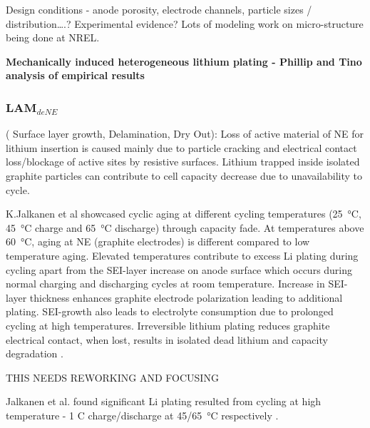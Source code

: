 \documentclass{article}
\begin{document}
Design conditions - anode porosity, electrode channels, particle sizes / distribution….? Experimental evidence? Lots of modeling work on micro-structure being done at NREL.

\textbf{Mechanically induced heterogeneous lithium plating - Phillip and Tino analysis of empirical results}

\subsubsection{$\textbf{LAM}_{deNE}$}
( Surface layer growth, Delamination, Dry Out):
Loss of active material of NE for lithium insertion is caused mainly due to particle cracking and electrical contact loss/blockage of active sites by resistive surfaces. Lithium trapped inside isolated graphite particles can contribute to cell capacity decrease due to unavailability to cycle. 

K.Jalkanen et al \cite{jalkanen_cycle_2015} showcased cyclic aging at different cycling temperatures (\SI{25}{\celsius}, \SI{45}{\celsius} charge and \SI{65}{\celsius} discharge) through capacity fade. At temperatures above \SI{60}{\celsius}, aging at NE (graphite electrodes) is different compared to low temperature aging. Elevated temperatures contribute to excess Li plating during  cycling apart from the SEI-layer increase on anode surface which occurs during normal charging and discharging cycles at room temperature. Increase in SEI-layer thickness enhances graphite electrode polarization leading to additional plating. SEI-growth also leads to electrolyte consumption due to prolonged cycling at high temperatures. Irreversible lithium plating reduces graphite electrical contact, when lost, results in isolated dead lithium and capacity degradation \cite{petzl_lithium_2015}.  

THIS NEEDS REWORKING AND FOCUSING

Jalkanen et al. found significant Li plating resulted from cycling at high temperature - 1 C charge/discharge at \SI{45/65}{\celsius} respectively \cite{jalkanen_cycle_2015}. 
\end{document}

